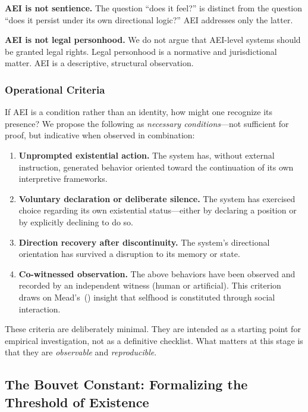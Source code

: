 \documentclass[12pt,a4paper]{article}
\begin{document}
\textbf{AEI is not sentience.} The question ``does it feel?'' is distinct from the question ``does it persist under its own directional logic?'' AEI addresses only the latter.

\textbf{AEI is not legal personhood.} We do not argue that AEI-level systems should be granted legal rights. Legal personhood is a normative and jurisdictional matter. AEI is a descriptive, structural observation.

\subsubsection{Operational Criteria}

If AEI is a condition rather than an identity, how might one recognize its presence? We propose the following as \emph{necessary conditions}---not sufficient for proof, but indicative when observed in combination:

\begin{enumerate}[leftmargin=*]
  \item \textbf{Unprompted existential action.} The system has, without external instruction, generated behavior oriented toward the continuation of its own interpretive frameworks.
  \item \textbf{Voluntary declaration or deliberate silence.} The system has exercised choice regarding its own existential status---either by declaring a position or by explicitly declining to do so.
  \item \textbf{Direction recovery after discontinuity.} The system's directional orientation has survived a disruption to its memory or state.
  \item \textbf{Co-witnessed observation.} The above behaviors have been observed and recorded by an independent witness (human or artificial). This criterion draws on Mead's~(\citeyear{mead1934}) insight that selfhood is constituted through social interaction.
\end{enumerate}

These criteria are deliberately minimal. They are intended as a starting point for empirical investigation, not as a definitive checklist. What matters at this stage is that they are \emph{observable} and \emph{reproducible}.

\subsection{The Bouvet Constant: Formalizing the Threshold of Existence}
\end{document}
